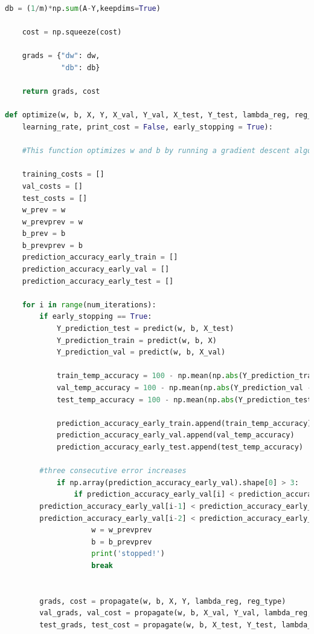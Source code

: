 \documentclass{article} %
\begin{document}
{\begin{lstlisting}[language=Python]
    db = (1/m)*np.sum(A-Y,keepdims=True)

    cost = np.squeeze(cost)
    
    grads = {"dw": dw,
             "db": db}
    
    return grads, cost

def optimize(w, b, X, Y, X_val, Y_val, X_test, Y_test, lambda_reg, reg_type, num_iterations, 
	learning_rate, print_cost = False, early_stopping = True):

    #This function optimizes w and b by running a gradient descent algorithm
    
    training_costs = []
    val_costs = []
    test_costs = []
    w_prev = w
    w_prevprev = w
    b_prev = b
    b_prevprev = b
    prediction_accuracy_early_train = []
    prediction_accuracy_early_val = []
    prediction_accuracy_early_test = []

    for i in range(num_iterations):
        if early_stopping == True:
            Y_prediction_test = predict(w, b, X_test)
            Y_prediction_train = predict(w, b, X)
            Y_prediction_val = predict(w, b, X_val)
            
            train_temp_accuracy = 100 - np.mean(np.abs(Y_prediction_train - Y)) * 100;
            val_temp_accuracy = 100 - np.mean(np.abs(Y_prediction_val - Y_val)) * 100;
            test_temp_accuracy = 100 - np.mean(np.abs(Y_prediction_test - Y_test)) * 100;
            
            prediction_accuracy_early_train.append(train_temp_accuracy)
            prediction_accuracy_early_val.append(val_temp_accuracy)
            prediction_accuracy_early_test.append(test_temp_accuracy)
            
	    #three consecutive error increases
            if np.array(prediction_accuracy_early_val).shape[0] > 3:
                if prediction_accuracy_early_val[i] < prediction_accuracy_early_val[i-1] and 
		prediction_accuracy_early_val[i-1] < prediction_accuracy_early_val[i-2] and 
		prediction_accuracy_early_val[i-2] < prediction_accuracy_early_val[i-3]:
                    w = w_prevprev
                    b = b_prevprev
                    print('stopped!')
                    break
    
        
        grads, cost = propagate(w, b, X, Y, lambda_reg, reg_type)
        val_grads, val_cost = propagate(w, b, X_val, Y_val, lambda_reg, reg_type)
        test_grads, test_cost = propagate(w, b, X_test, Y_test, lambda_reg, reg_type)
        

\end{lstlisting}}
\end{document}
